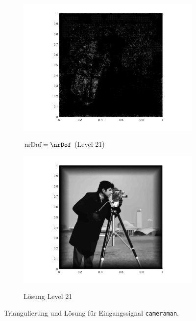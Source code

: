 \begin{figure}[p]
  \begin{subfigure}[b]{.48\linewidth}
    \centering
    \caption{$\text{nrDof} = \nrDof$ (Level 21)}
    \includegraphics[trim = 100 30 80 20, clip, width=\linewidth]
      {pictures/chapExperiments/secGrayscale/cam/adaptive/lvl21/triangulation.png}
    \label{fig:camLvl21Triang}
  \end{subfigure}
  \quad
  \begin{subfigure}[b]{.48\linewidth}
    \centering
    \caption{Lösung Level 21}
    \includegraphics[trim = 100 30 80 20, clip, width=\linewidth]
      {pictures/chapExperiments/secGrayscale/cam/adaptive/lvl21/solutionGrayscale.png}
    \label{fig:camLvl21Sol}
  \end{subfigure}
  \caption{Triangulierung und Lösung für Eingangssignal \texttt{cameraman}.}
  \label{fig:camTriang}
\end{figure}
